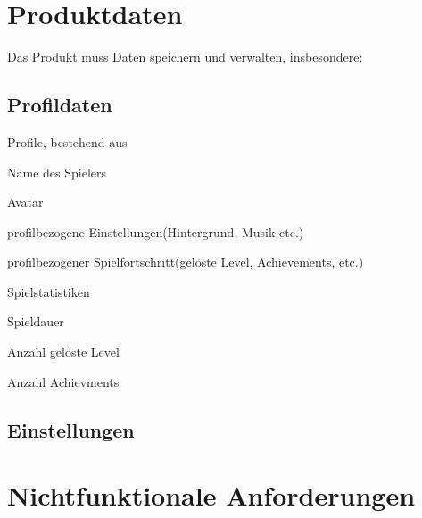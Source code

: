 \documentclass{scrartcl}
\begin{document}
\clearpage









\section{Produktdaten}
Das Produkt muss Daten speichern und verwalten, insbesondere: 

\subsection{Profildaten}

\begin{pdlist}
    \item Profile, bestehend aus 
    \begin{pdlist}
        \item Name des Spielers
        \item Avatar
        \item profilbezogene Einstellungen(Hintergrund, Musik etc.) 
        \item profilbezogener Spielfortschritt(gelöste Level, Achievements, etc.)
    \end{pdlist}
    \item Spielstatistiken
    \begin{pdlist}
        \item Spieldauer
        \item Anzahl gelöste Level
        \item Anzahl Achievments
    \end{pdlist}
\end{pdlist}

\subsection{Einstellungen}

\clearpage









\section{Nichtfunktionale Anforderungen}
\end{document}
